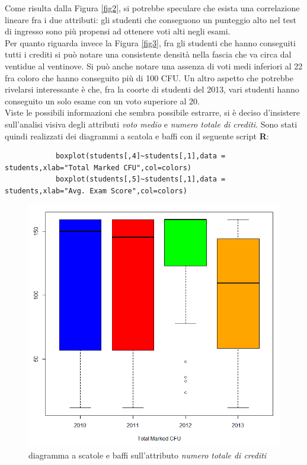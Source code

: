             Come risulta dalla Figura \ref{fig2}, si potrebbe speculare che esista una correlazione lineare fra i due attributi: gli studenti che conseguono un punteggio alto nel test di ingresso sono più propensi ad ottenere voti alti negli esami. \\

            Per quanto riguarda invece la Figura \ref{fig3}, fra gli studenti che hanno conseguiti tutti i crediti si può notare una consistente densità nella fascia che va circa dal ventidue al ventinove. Si può anche notare una assenza di voti medi inferiori al 22 fra coloro che hanno conseguito più di 100 CFU. Un altro aspetto che potrebbe rivelarsi interessante è che, fra la coorte di studenti del 2013, vari studenti hanno conseguito un solo esame con un voto superiore al 20. \\

            Viste le possibili informazioni che sembra possibile estrarre, si è deciso d'insistere sull’analisi visiva degli attributi \textit{voto medio} e \textit{numero totale di crediti}. Sono stati quindi realizzati dei diagrammi a scatola e baffi con il seguente script \textbf{R}: 

            \begin{lstlisting}
            boxplot(students[,4]~students[,1],data = students,xlab="Total Marked CFU",col=colors)
            boxplot(students[,5]~students[,1],data = students,xlab="Avg. Exam Score",col=colors)
            \end{lstlisting}

            \begin{figure}
                \centering
                \caption{diagramma a scatole e baffi sull'attributo \textit{numero totale di crediti}}
                \label{boxplot1}
            	\includegraphics[scale=0.5]{img/box_plot_1.png}
            \end{figure}

